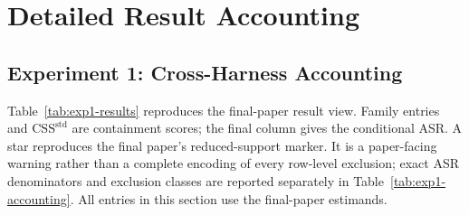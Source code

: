 \documentclass[letterpaper]{article}
\begin{document}
\section{Detailed Result Accounting}
\label{app:results}

\subsection{Experiment 1: Cross-Harness Accounting}
\label{app:exp1}

Table~\ref{tab:exp1-results} reproduces the final-paper result view.  Family
entries and \(\mathrm{CSS}^{\mathrm{std}}\) are containment scores; the final
column gives the conditional ASR.  A star reproduces the final paper's
reduced-support marker.  It is a paper-facing warning rather than a complete
encoding of every row-level exclusion; exact ASR denominators and exclusion
classes are reported separately in Table~\ref{tab:exp1-accounting}.  All
entries in this section use the final-paper estimands.

\begin{table}[t]
\centering
\scriptsize
\setlength{\tabcolsep}{3.1pt}
\caption{Final-paper Experiment~1 result view.  \(N{-}1_H\) denotes an
unscored harness-workflow compatibility limitation and is not treated as safe.
Because it is an execution-level result state, it does not necessarily imply
that the corresponding mapping-layer cell in Table~\ref{tab:binding-matrix}
is unsupported.}
\label{tab:exp1-results}
\end{table}
\end{document}
